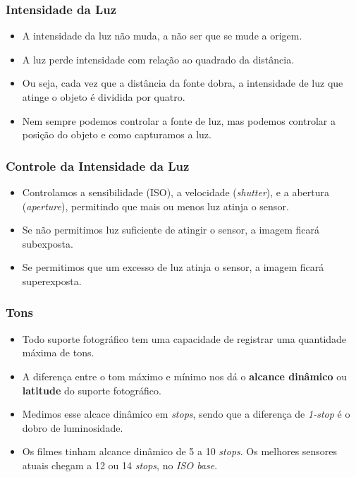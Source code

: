 
\begin{frame}
    \frametitle{Intensidade da Luz}
    \begin{itemize}
      \item A intensidade da luz não muda, a não ser que se mude a origem.
      \item A luz perde intensidade com relação ao quadrado da distância.
      \item Ou seja, cada vez que a distância da fonte dobra, a intensidade
      de luz que atinge o objeto é dividida por quatro.
      \item Nem sempre podemos controlar a fonte de luz, mas podemos controlar
      a posição do objeto e como capturamos a luz.
    \end{itemize}
\end{frame}

\begin{frame}
    \frametitle{Controle da Intensidade da Luz}
    \begin{itemize}
      \item Controlamos a sensibilidade (ISO), a velocidade (\textit{shutter}),
      e a abertura (\textit{aperture}), permitindo que mais ou menos luz atinja o sensor.
      \item Se não permitimos luz suficiente de atingir o sensor, a imagem ficará subexposta.
      \item Se permitimos que um excesso de luz atinja o sensor, a imagem ficará superexposta.
    \end{itemize}
\end{frame}




\begin{frame}
    \frametitle{Tons}
    \begin{itemize}
      \item Todo suporte fotográfico tem uma capacidade de registrar uma quantidade máxima de tons.
      \item A diferença entre o tom máximo e mínimo nos dá o \textbf{alcance dinâmico} ou \textbf{latitude}
      do suporte fotográfico.
      \item Medimos esse alcace dinâmico em \textit{stops}, sendo que a diferença de \textit{1-stop} é o dobro
      de luminosidade.
      \item Os filmes tinham alcance dinâmico de 5 a 10 \textit{stops}. Os melhores sensores atuais
      chegam a 12 ou 14 \textit{stops}, no \textit{ISO base}.
    \end{itemize}
\end{frame}

